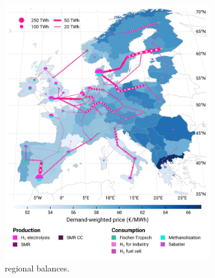 \documentclass[preprint,12pt,sort&compress]{elsarticle}
\begin{document}
\begin{figure}[htbp]
  \centering
  \begin{subfigure}[t]{0.49\textwidth}
      \vspace{0pt}
      \includegraphics[width=1\textwidth]{maps/pcipmi-national-international-expansion/base_s_adm___2050-balance_map_H2}
      \vspace{-0.5cm}
      \caption{ regional balances.}
      \label{fig:PCI-in_lt_2050_h2}
  \end{subfigure}
  \hfill
  \begin{subfigure}[t]{0.49\textwidth}
      \vspace{0pt}

\end{subfigure}
\end{figure}
\end{document}
